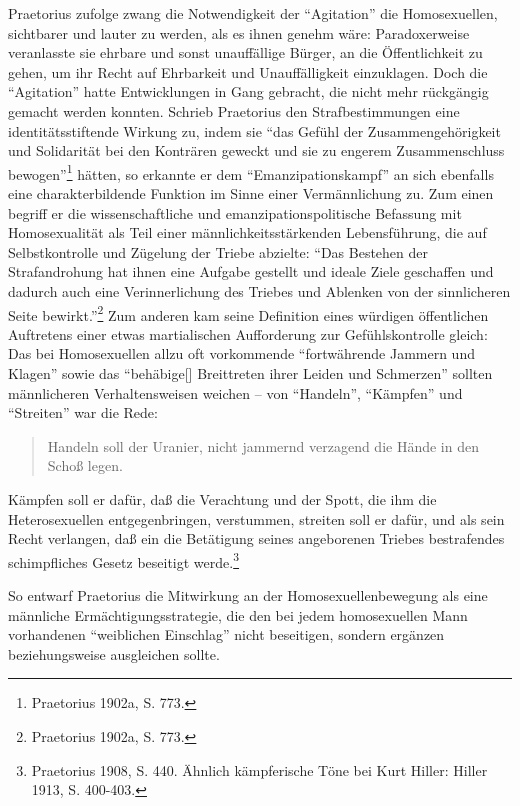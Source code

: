\documentclass[a4paper,
fontsize=11pt,
oneside,
numbers=noperiodatend,
parskip=half-,
bibliography=totoc,
final
]{scrartcl}
\begin{document}
Praetorius zufolge zwang die Notwendigkeit der \enquote{Agitation} die
Homosexuellen, sichtbarer und lauter zu werden, als es ihnen genehm
wäre: Paradoxerweise veranlasste sie ehrbare und sonst unauffällige
Bürger, an die Öffentlichkeit zu gehen, um ihr Recht auf Ehrbarkeit und
Unauffälligkeit einzuklagen. Doch die \enquote{Agitation} hatte
Entwicklungen in Gang gebracht, die nicht mehr rückgängig gemacht werden
konnten. Schrieb Praetorius den Strafbestimmungen eine
identitätsstiftende Wirkung zu, indem sie \enquote{das Gefühl der
Zusammengehörigkeit und Solidarität bei den Konträren geweckt und sie zu
engerem Zusammenschluss bewogen}\footnote{Praetorius 1902a, S. 773.}
hätten, so erkannte er dem \enquote{Emanzipationskampf} an sich
ebenfalls eine charakterbildende Funktion im Sinne einer Vermännlichung
zu. Zum einen begriff er die wissenschaftliche und
emanzipationspolitische Befassung mit Homosexualität als Teil einer
männlichkeitsstärkenden Lebensführung, die auf Selbstkontrolle und
Zügelung der Triebe abzielte: \enquote{Das Bestehen der Strafandrohung
hat ihnen eine Aufgabe gestellt und ideale Ziele geschaffen und dadurch
auch eine Verinnerlichung des Triebes und Ablenken von der sinnlicheren
Seite bewirkt.}\footnote{Praetorius 1902a, S. 773.} Zum anderen kam
seine Definition eines würdigen öffentlichen Auftretens einer etwas
martialischen Aufforderung zur Gefühlskontrolle gleich: Das bei
Homosexuellen allzu oft vorkommende \enquote{fortwährende Jammern und
Klagen} sowie das \enquote{behäbige{[}{]} Breittreten ihrer Leiden und
Schmerzen} sollten männlicheren Verhaltensweisen weichen -- von
\enquote{Handeln}, \enquote{Kämpfen} und \enquote{Streiten} war die
Rede:

\begin{quote}
Handeln soll der Uranier, nicht jammernd verzagend die Hände in den
Schoß legen.
\end{quote}

Kämpfen soll er dafür, daß die Verachtung und der Spott, die ihm die
Heterosexuellen entgegenbringen, verstummen, streiten soll er dafür, und
als sein Recht verlangen, daß ein die Betätigung seines angeborenen
Triebes bestrafendes schimpfliches Gesetz beseitigt werde.\footnote{Praetorius
  1908, S. 440. Ähnlich kämpferische Töne bei Kurt Hiller: Hiller 1913,
  S. 400-403.}

So entwarf Praetorius die Mitwirkung an der Homosexuellenbewegung als
eine männliche Ermächtigungsstrategie, die den bei jedem homosexuellen
Mann vorhandenen \enquote{weiblichen Einschlag} nicht beseitigen,
sondern ergänzen beziehungsweise ausgleichen sollte.
\end{document}
